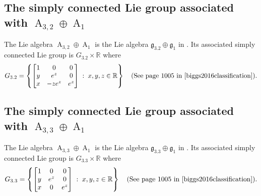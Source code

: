 \documentclass[12pt,a4paper,twoside]{article}
\theoremstyle{definition}
\begin{document}
\subsection{The simply connected Lie group associated with $\operatorname{A}_{3, 2} \oplus \operatorname{A}_1$}
The Lie algebra $\operatorname{A}_{3, 2} \oplus \operatorname{A}_1$ is the Lie algebra $\mathfrak{g}_{3.2} \oplus \mathfrak{g}_1$ in \cite{biggs2016classification}. Its associated simply connected Lie group is $G_{3.2} \times \mathbb{R}$ where
$$G_{3.2} = \left\lbrace \begin{bmatrix}
1 & 0 & 0\\
y & e^z & 0\\
x & -ze^z & e^z
\end{bmatrix} \;:\; x, y, z \in \mathbb{R}\right\rbrace \quad (\text{See page 1005 in \cite{biggs2016classification}}).$$
\subsection{The simply connected Lie group associated with $\operatorname{A}_{3, 3} \oplus \operatorname{A}_1$}
The Lie algebra $\operatorname{A}_{3, 3} \oplus \operatorname{A}_1$ is the Lie algebra $\mathfrak{g}_{3.3} \oplus \mathfrak{g}_1$ in \cite{biggs2016classification}. Its associated simply connected Lie group is $G_{3.3} \times \mathbb{R}$ where
$$G_{3.3} = \left\lbrace \begin{bmatrix}
1 & 0 & 0\\
y & e^z & 0\\
x & 0 & e^z
\end{bmatrix} \;:\; x, y, z \in \mathbb{R}\right\rbrace \quad (\text{See page 1005 in \cite{biggs2016classification}}).$$
\end{document}
